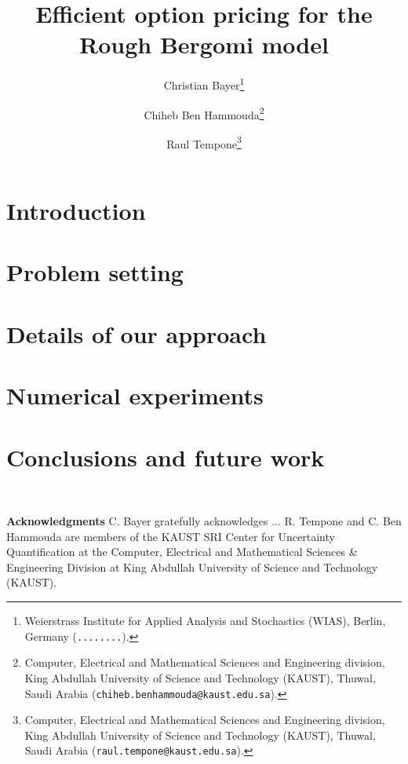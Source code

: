 \documentclass[11pt]{article}
\title{Efficient option pricing for  the Rough Bergomi model}
\author{Christian Bayer\thanks{
 Weierstrass Institute for Applied Analysis and Stochastics (WIAS),
 Berlin, Germany ({\tt........}).}
        \and Chiheb Ben Hammouda\thanks{Computer, Electrical and Mathematical Sciences and Engineering division,
 King Abdullah University of Science and Technology (KAUST),
 Thuwal, Saudi Arabia ({\tt chiheb.benhammouda@kaust.edu.sa}).} 
\and  Raul Tempone\thanks{Computer, Electrical and Mathematical Sciences and Engineering division,
 King Abdullah University of Science and Technology (KAUST),
 Thuwal, Saudi Arabia ({\tt raul.tempone@kaust.edu.sa}).}}
\begin{document}
\maketitle

\begin{abstract}
	  
\end{abstract}






\thispagestyle{plain}

\setcounter{tocdepth}{1}


 \section{Introduction}




 \section{Problem setting}\label{sec:Problem setting}




\section{Details of our approach}\label{sec:Details our approach and error bounds}





\section{Numerical experiments}\label{sec:Numerical tests}




\section{Conclusions and future work}



\

\textbf{Acknowledgments} C. Bayer gratefully acknowledges ... R. Tempone and C. Ben Hammouda are members of the KAUST SRI Center for Uncertainty Quantification at the Computer, Electrical and Mathematical Sciences \& Engineering Division at King Abdullah University of Science and Technology (KAUST). 




 




%






 

 

 
 
 
\end{document}
